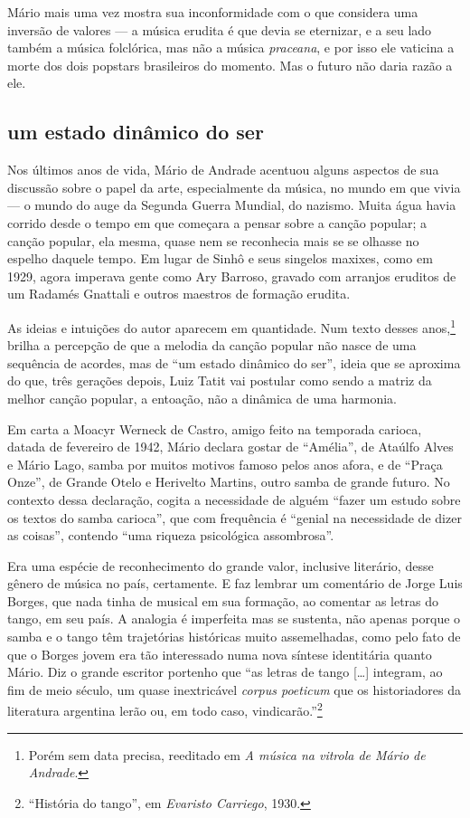 Mário mais uma vez mostra sua inconformidade com o que considera uma
inversão de valores --- a música erudita é que devia se eternizar, e a
seu lado também a música folclórica, mas não a música \textit{praceana}, e
por isso ele vaticina a morte dos dois popstars brasileiros do momento.
Mas o futuro não daria razão a ele.

\subsection{um estado dinâmico do ser}

Nos últimos anos de vida, Mário de Andrade acentuou alguns aspectos de
sua discussão sobre o papel da arte, especialmente da música, no mundo
em que vivia --- o mundo do auge da Segunda Guerra Mundial, do nazismo.
Muita água havia corrido desde o tempo em que começara a pensar sobre a
canção popular; a canção popular, ela mesma, quase nem se reconhecia
mais se se olhasse no espelho daquele tempo. Em lugar de Sinhô e seus
singelos maxixes, como em 1929, agora imperava gente como Ary Barroso,
gravado com arranjos eruditos de um Radamés Gnattali e outros maestros
de formação erudita.

As ideias e intuições do autor aparecem em quantidade. Num texto desses
anos,\footnote{Porém sem data precisa, reeditado em \textit{A música na vitrola de
Mário de Andrade}.} brilha a percepção de que a melodia da canção
popular não nasce de uma sequência de acordes, mas de ``um estado
dinâmico do ser'', ideia que se aproxima do que, três gerações depois,
Luiz Tatit vai postular como sendo a matriz da melhor canção popular, a
entoação, não a dinâmica de uma harmonia.

Em carta a Moacyr Werneck de Castro, amigo feito na temporada carioca,
datada de fevereiro de 1942, Mário declara gostar de ``Amélia'', de
Ataúlfo Alves e Mário Lago, samba por muitos motivos famoso pelos anos
afora, e de ``Praça Onze'', de Grande Otelo e Herivelto Martins, outro
samba de grande futuro. No contexto dessa declaração, cogita a
necessidade de alguém ``fazer um estudo sobre os textos do samba
carioca'', que com frequência é ``genial na necessidade de dizer as
coisas'', contendo ``uma riqueza psicológica assombrosa''.

Era uma espécie de reconhecimento do grande valor, inclusive literário,
desse gênero de música no país, certamente. E faz lembrar um comentário
de Jorge Luis Borges, que nada tinha de musical em sua formação, ao
comentar as letras do tango, em seu país. A analogia é imperfeita mas se
sustenta, não apenas porque o samba e o tango têm trajetórias históricas
muito assemelhadas, como pelo fato de que o Borges jovem era tão
interessado numa nova síntese identitária quanto Mário. Diz o grande
escritor portenho que ``as letras de tango {[}\ldots{}{]} integram, ao fim de
meio século, um quase inextricável \textit{corpus poeticum} que os
historiadores da literatura argentina lerão ou, em todo caso,
vindicarão.''\footnote{``História do tango'', em \textit{Evaristo Carriego}, 1930.}

